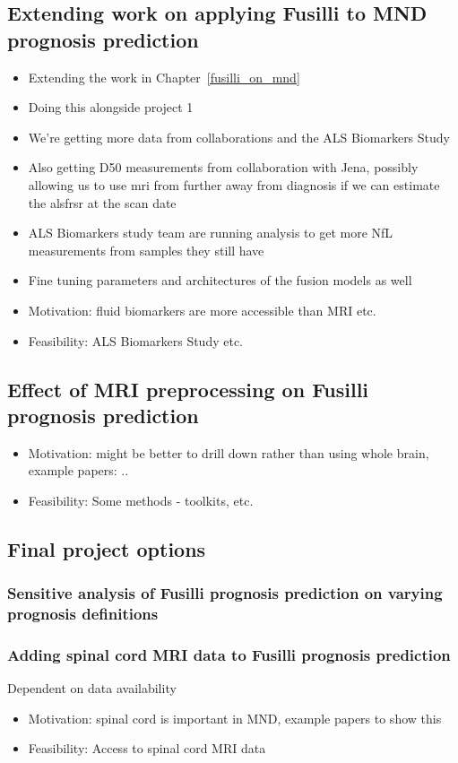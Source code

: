 \subsection{Extending work on applying Fusilli to MND prognosis prediction}
\begin{itemize}
    \item Extending the work in Chapter~\ref{fusilli_on_mnd}
    \item Doing this alongside project 1
    \item We're getting more data from collaborations and the ALS Biomarkers Study
    \item Also getting D50 measurements from collaboration with Jena, possibly allowing us to use mri from further away from diagnosis if we can estimate the alsfrsr at the scan date
    \item ALS Biomarkers study team are running analysis to get more NfL measurements from samples they still have
    \item Fine tuning parameters and architectures of the fusion models as well
    \item Motivation: fluid biomarkers are more accessible than MRI etc.
    \item Feasibility: ALS Biomarkers Study etc.
\end{itemize}

\subsection{Effect of MRI preprocessing on Fusilli prognosis prediction}
\begin{itemize}
    \item Motivation: might be better to drill down rather than using whole brain, example papers: ..
    \item Feasibility: Some methods - toolkits, etc.
\end{itemize}

\subsection{Final project options}

\subsubsection{Sensitive analysis of Fusilli prognosis prediction on varying prognosis definitions}

\subsubsection{Adding spinal cord MRI data to Fusilli prognosis prediction}
Dependent on data availability
\begin{itemize}
    \item Motivation: spinal cord is important in MND, example papers to show this
    \item Feasibility: Access to spinal cord MRI data
\end{itemize}

